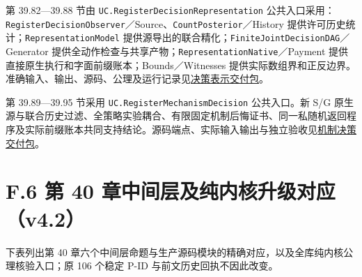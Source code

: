 \documentclass[
  11pt,
  oneside]{book}
\begin{document}
第 39.82---39.88 节由 \nolinkurl{UC.RegisterDecisionRepresentation} 公共入口采用：\nolinkurl{RegisterDecisionObserver}／Source、\nolinkurl{CountPosterior}／History 提供许可历史统计；\nolinkurl{RepresentationModel} 提供源导出的联合精化；\nolinkurl{FiniteJointDecisionDAG}／Generator 提供全动作检查与共享产物；\nolinkurl{RepresentationNative}／Payment 提供直接原生执行和字面前缀账本；Bounds／Witnesses 提供实际数组界和正反边界。准确输入、输出、源码、公理及运行记录见\href{../formalization/ueot-core/docs/compression/theory_completion/unified_closure/decision_representation_closure_v1/README.md}{决策表示交付包}。

第 39.89---39.95 节采用 \nolinkurl{UC.RegisterMechanismDecision} 公共入口。新 S/G 原生源与联合历史过滤、全策略实验耦合、有限固定机制后悔证书、同一私随机返回程序及实际前缀账本共同支持结论。源码端点、实际输入输出与独立验收见\href{../formalization/ueot-core/docs/compression/theory_completion/unified_closure/mechanism_decision_closure_v1/README.md}{机制决策交付包}。

\section{F.6 第 40 章中间层及纯内核升级对应（v4.2）}\label{f.6-ux7b2c-40-ux7ae0ux4e2dux95f4ux5c42ux53caux7eafux5185ux6838ux5347ux7ea7ux5bf9ux5e94v4.2}

下表列出第 40 章六个中间层命题与生产源码模块的精确对应，以及全库纯内核公理核验入口；原 106 个稳定 P-ID 与前文历史回执不因此改变。
\end{document}
